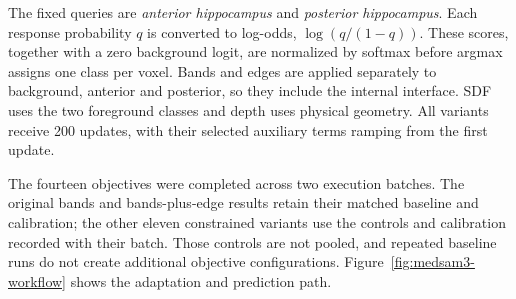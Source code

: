The fixed queries are \emph{anterior hippocampus} and \emph{posterior
hippocampus}. Each response probability $q$ is converted to log-odds,
$\log(q/(1-q))$. These scores, together with a zero background logit, are
normalized by softmax before argmax assigns one class per voxel. Bands and
edges are applied separately to background, anterior and posterior, so they
include the internal interface. SDF uses the two foreground classes and
depth uses physical geometry. All variants receive 200 updates, with their
selected auxiliary terms ramping from the first update.

The fourteen objectives were completed across two execution batches.
The original bands and bands-plus-edge results retain their matched
baseline and calibration; the other eleven constrained variants use
the controls and calibration recorded with their batch. Those controls
are not pooled, and repeated baseline runs do not create additional
objective configurations.
Figure~\ref{fig:medsam3-workflow} shows the adaptation and prediction
path.


